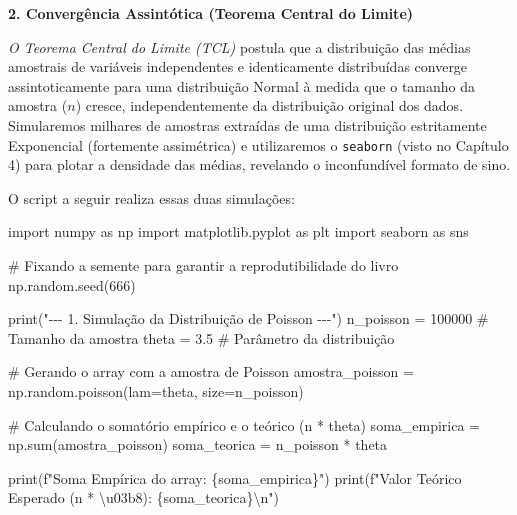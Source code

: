 \documentclass[
  brazilian,
  letterpaper,
  DIV=11,
  numbers=noendperiod]{scrreprt}
\newenvironment{Shaded}{\begin{snugshade}}{\end{snugshade}}
\newcommand{\BuiltInTok}[1]{\textcolor[rgb]{0.00,0.23,0.31}{#1}}
\newcommand{\CharTok}[1]{\textcolor[rgb]{0.13,0.47,0.30}{#1}}
\newcommand{\CommentTok}[1]{\textcolor[rgb]{0.37,0.37,0.37}{#1}}
\newcommand{\DecValTok}[1]{\textcolor[rgb]{0.68,0.00,0.00}{#1}}
\newcommand{\FloatTok}[1]{\textcolor[rgb]{0.68,0.00,0.00}{#1}}
\newcommand{\ImportTok}[1]{\textcolor[rgb]{0.00,0.46,0.62}{#1}}
\newcommand{\NormalTok}[1]{\textcolor[rgb]{0.00,0.23,0.31}{#1}}
\newcommand{\OperatorTok}[1]{\textcolor[rgb]{0.37,0.37,0.37}{#1}}
\newcommand{\SpecialCharTok}[1]{\textcolor[rgb]{0.37,0.37,0.37}{#1}}
\newcommand{\SpecialStringTok}[1]{\textcolor[rgb]{0.13,0.47,0.30}{#1}}
\newcommand{\StringTok}[1]{\textcolor[rgb]{0.13,0.47,0.30}{#1}}
\begin{document}
\textbf{2. Convergência Assintótica (Teorema Central do Limite)}

\emph{O Teorema Central do Limite (TCL)} postula que a distribuição das
médias amostrais de variáveis independentes e identicamente distribuídas
converge assintoticamente para uma distribuição Normal à medida que o
tamanho da amostra (\(n\)) cresce, independentemente da distribuição
original dos dados. Simularemos milhares de amostras extraídas de uma
distribuição estritamente Exponencial (fortemente assimétrica) e
utilizaremos o \texttt{seaborn} (visto no Capítulo 4) para plotar a
densidade das médias, revelando o inconfundível formato de sino.

O script a seguir realiza essas duas simulações:

\begin{Shaded}
\begin{Highlighting}[]
\ImportTok{import}\NormalTok{ numpy }\ImportTok{as}\NormalTok{ np}
\ImportTok{import}\NormalTok{ matplotlib.pyplot }\ImportTok{as}\NormalTok{ plt}
\ImportTok{import}\NormalTok{ seaborn }\ImportTok{as}\NormalTok{ sns}

\CommentTok{\# Fixando a semente para garantir a reprodutibilidade do livro}
\NormalTok{np.random.seed(}\DecValTok{666}\NormalTok{)}

\BuiltInTok{print}\NormalTok{(}\StringTok{"{-}{-}{-} 1. Simulação da Distribuição de Poisson {-}{-}{-}"}\NormalTok{)}
\NormalTok{n\_poisson }\OperatorTok{=} \DecValTok{100000}  \CommentTok{\# Tamanho da amostra}
\NormalTok{theta }\OperatorTok{=} \FloatTok{3.5}         \CommentTok{\# Parâmetro da distribuição}

\CommentTok{\# Gerando o array com a amostra de Poisson}
\NormalTok{amostra\_poisson }\OperatorTok{=}\NormalTok{ np.random.poisson(lam}\OperatorTok{=}\NormalTok{theta, size}\OperatorTok{=}\NormalTok{n\_poisson)}

\CommentTok{\# Calculando o somatório empírico e o teórico (n * theta)}
\NormalTok{soma\_empirica }\OperatorTok{=}\NormalTok{ np.}\BuiltInTok{sum}\NormalTok{(amostra\_poisson)}
\NormalTok{soma\_teorica }\OperatorTok{=}\NormalTok{ n\_poisson }\OperatorTok{*}\NormalTok{ theta}

\BuiltInTok{print}\NormalTok{(}\SpecialStringTok{f"Soma Empírica do array: }\SpecialCharTok{\{}\NormalTok{soma\_empirica}\SpecialCharTok{\}}\SpecialStringTok{"}\NormalTok{)}
\BuiltInTok{print}\NormalTok{(}\SpecialStringTok{f"Valor Teórico Esperado (n * }\CharTok{\textbackslash{}u03b8}\SpecialStringTok{): }\SpecialCharTok{\{}\NormalTok{soma\_teorica}\SpecialCharTok{\}}\CharTok{\textbackslash{}n}\SpecialStringTok{"}\NormalTok{)}



\end{Highlighting}
\end{Shaded}
\end{document}

